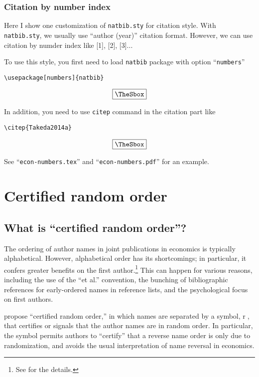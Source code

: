 \documentclass[10pt]{article}
\newenvironment{Frame}%
{\setlength{\fboxsep}{15pt}
\setlength{\mylength}{\linewidth}%
\addtolength{\mylength}{-2\fboxsep}%
\addtolength{\mylength}{-2\fboxrule}%
\Sbox
\minipage{\mylength}%
\setlength{\abovedisplayskip}{0pt}%
\setlength{\belowdisplayskip}{0pt}%
}%
{\endminipage\endSbox
\[\fbox{\TheSbox}\]}
\begin{document}
\subsubsection{Citation by number index}

Here I show one customization of \texttt{natbib.sty} for citation style.  With
\texttt{natbib.sty}, we usually use ``author (year)'' citation format. However,
we can use citation by numder index like [1], [2], [3]...

To use this style, you first need to load \texttt{natbib} package with option
``\texttt{numbers}''
\begin{Frame}
\begin{verbatim}
\usepackage[numbers]{natbib}        
\end{verbatim} 
\end{Frame}

In addition, you need to use \texttt{citep} command in the citation part like
\begin{Frame}
\begin{verbatim}
\citep{Takeda2014a}
\end{verbatim} 
\end{Frame}

See ``\texttt{econ-numbers.tex}'' and ``\texttt{econ-numbers.pdf}'' for an example.

\section{Certified random order}
\label{sec:cro}

\subsection{What is ``certified random order''?}

The ordering of author names in joint publications in economics is typically
alphabetical.  However, alphabetical order has its shortcomings; in particular,
it confers greater benefits on the first author.\footnote{See
\citet{10.1257/aer.20161492} for the details.} This can happen for various
reasons, including the use of the ``et al.'' convention, the bunching of
bibliographic references for early-ordered names in reference lists, and the
psychological focus on first authors.

\citet{10.1257/aer.20161492} propose ``certified random order,'' in which names
are separated by a symbol, \textcircled{r}, that certifies or signals that the
author names are in random order. In particular, the symbol permits authors to
``certify'' that a reverse name order is only due to randomization, and avoids
the usual interpretation of name reversal in economics.
\end{document}
